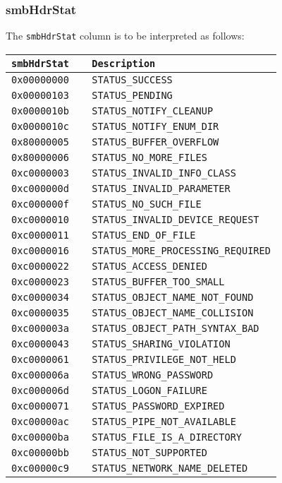 \documentclass[documentation]{subfiles}
\begin{document}
\subsubsection{smbHdrStat}\label{smbHdrStat}
The {\tt smbHdrStat} column is to be interpreted as follows:
\begin{longtable}{>{\tt}r>{\tt}l}
    \toprule
    {\bf smbHdrStat} & {\bf Description}\\
    \midrule\endhead%
    0x00000000 & STATUS\_SUCCESS\\
    0x00000103 & STATUS\_PENDING\\
    0x0000010b & STATUS\_NOTIFY\_CLEANUP\\
    0x0000010c & STATUS\_NOTIFY\_ENUM\_DIR\\
    0x80000005 & STATUS\_BUFFER\_OVERFLOW\\
    0x80000006 & STATUS\_NO\_MORE\_FILES\\
    0xc0000003 & STATUS\_INVALID\_INFO\_CLASS\\
    0xc000000d & STATUS\_INVALID\_PARAMETER\\
    0xc000000f & STATUS\_NO\_SUCH\_FILE\\
    0xc0000010 & STATUS\_INVALID\_DEVICE\_REQUEST\\
    0xc0000011 & STATUS\_END\_OF\_FILE\\
    0xc0000016 & STATUS\_MORE\_PROCESSING\_REQUIRED\\
    0xc0000022 & STATUS\_ACCESS\_DENIED\\
    0xc0000023 & STATUS\_BUFFER\_TOO\_SMALL\\
    0xc0000034 & STATUS\_OBJECT\_NAME\_NOT\_FOUND\\
    0xc0000035 & STATUS\_OBJECT\_NAME\_COLLISION\\
    0xc000003a & STATUS\_OBJECT\_PATH\_SYNTAX\_BAD\\
    0xc0000043 & STATUS\_SHARING\_VIOLATION\\
    0xc0000061 & STATUS\_PRIVILEGE\_NOT\_HELD\\
    0xc000006a & STATUS\_WRONG\_PASSWORD\\
    0xc000006d & STATUS\_LOGON\_FAILURE\\
    0xc0000071 & STATUS\_PASSWORD\_EXPIRED\\
    0xc00000ac & STATUS\_PIPE\_NOT\_AVAILABLE\\
    0xc00000ba & STATUS\_FILE\_IS\_A\_DIRECTORY\\
    0xc00000bb & STATUS\_NOT\_SUPPORTED\\
    0xc00000c9 & STATUS\_NETWORK\_NAME\_DELETED\\

\end{longtable}
\end{document}
